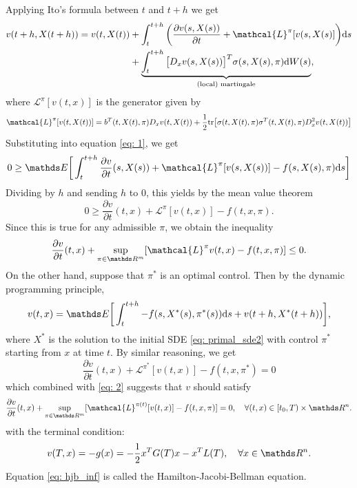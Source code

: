 Applying Ito's formula between $t$ and $t+h$ we get
\begin{align*}
    v(t+h, X(t+h)) = v(t, X(t)) &+ \int_t^{t+h} \bigg( \frac{\partial v(s, X(s))}{\partial t} + \mathcal{L}^\pi [v(s, X(s)] \bigg) \d s\\
    &+ \underbrace{\int_{t}^{t+h} \big[D_x v(s, X(s))\big]^T \sigma(s, X(s), \pi) \d W(s)}_{\text{(local) martingale}},
\end{align*}
where $\mathcal{L}^\pi[v(t,x)]$ is the generator given by
\begin{equation}
    \mathcal{L}^\pi [v(t, X(t))] 
    = b^T(t, X(t), \pi) D_x v(t, X(t)) + \frac12 \tr\big[\sigma(t, X(t), \pi) \sigma^T(t, X(t), \pi) D_x^2 v(t, X(t))\big]
    \label{eq: generator}
\end{equation}
Substituting into equation \eqref{eq: 1}, we get 
\begin{equation*}
    0 \ge \E \bigg[ \int_{t}^{t + h} \frac{\partial v}{\partial t}(s, X(s)) + \mathcal{L}^\pi[v(s, X(s))] - f(s, X(s), \pi) \d s \bigg]
\end{equation*}
Dividing by $h$ and sending $h$ to $0$, this yields by the mean value theorem 
\begin{equation*}
    0 \ge \frac{\partial v}{\partial t}(t, x) + \mathcal{L}^\pi[v(t,x)] - f(t, x, \pi).
\end{equation*}
Since this is true for any admissible $\pi$, we obtain the inequality
\begin{equation}
    \frac{\partial v}{\partial t} (t, x) + \sup_{\pi \in \R^m} [\mathcal{L}^\pi v(t,x) - f(t, x, \pi)] \le 0.
    \label{eq: 2}
\end{equation}
On the other hand, suppose that $\pi^*$ is an optimal control. Then by the dynamic programming principle, 
\begin{equation}
    v(t,x) = \E\bigg[ \int_{t}^{t+h} - f(s, X^*(s), \pi^*(s)) \d s + v(t+h, X^*(t+h)) \bigg],
\end{equation}
where $X^*$ is the solution to the initial SDE \eqref{eq: primal_sde2} with control $\pi^*$ starting from $x$ at time $t$. By similar reasoning, we get 
\begin{equation*}
    \frac{\partial v}{\partial t} (t,x) + \mathcal{L}^{\pi^*} [v(t,x)] - f(t, x, \pi^*) = 0
\end{equation*}
which combined with \eqref{eq: 2} suggests that $v$ should satisfy
\begin{equation}
    \frac{\partial v}{\partial t} (t,x) + \sup_{\pi \in \R^m} [\mathcal{L}^{\pi(t)} [v(t,x)] - f(t, x, \pi)] = 0, \quad \forall (t,x) \in [t_0, T) \times \R^n.
    \label{eq: hjb_inf}
\end{equation}
with the terminal condition:
\begin{equation*}
    v(T,x) = - g(x) = - \frac12 x^T G(T) x - x^T L(T), \quad \forall x \in \R^n.
\end{equation*}
Equation \eqref{eq: hjb_inf} is called the Hamilton-Jacobi-Bellman equation.
